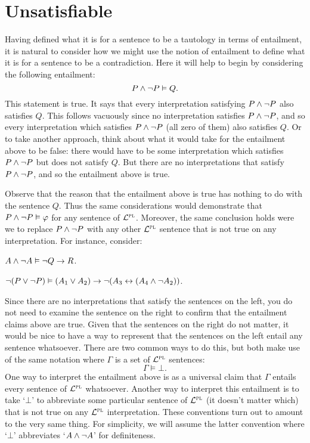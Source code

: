 \section{Unsatisfiable}

Having defined what it is for a sentence to be a tautology in terms of entailment, it is natural to consider how we might use the notion of entailment to define what it is for a sentence to be a contradiction.
Here it will help to begin by considering the following entailment:
$$P \wedge \neg P \vDash Q.$$
This statement is true.
It says that every interpretation satisfying $P \wedge \neg P$ also satisfies $Q$.
This follows vacuously since no interpretation satisfies $P \wedge \neg P$, and so every interpretation which satisfies $P \wedge \neg P$ (all zero of them) also satisfies $Q$.
Or to take another approach, think about what it would take for the entailment above to be false: there would have to be some interpretation which satisfies $P \wedge \neg P$ but does not satisfy $Q$.
But there are no interpretations that satisfy $P \wedge \neg P$, and so the entailment above is true.

Observe that the reason that the entailment above is true has nothing to do with the sentence $Q$.
Thus the same considerations would demonstrate that $P \wedge \neg P \vDash \varphi$ for any sentence \metaA of $\mathcal{L}^{\textsc{pl}}$.
Moreover, the same conclusion holds were we to replace $P \wedge \neg P$ with any other $\mathcal{L}^{\textsc{pl}}$ sentence that is not true on any interpretation.
For instance, consider:

\begin{earg}
\item[] $A \wedge \neg A \vDash \neg Q \rightarrow R$.
\item[] $\neg (P \vee \neg P) \vDash (A_1 \vee A_2) \rightarrow \neg (A_3 \leftrightarrow (A_4 \wedge \neg A_2))$.
\end{earg}

Since there are no interpretations that satisfy the sentences on the left, you do not need to examine the sentence on the right to confirm that the entailment claims above are true.
Given that the sentences on the right do not matter, it would be nice to have a way to represent that the sentences on the left entail any sentence whatsoever.
There are two common ways to do this, but both make use of the same notation where $\Gamma$ is a set of $\mathcal{L}^{\textsc{pl}}$ sentences:
$$\Gamma \models \bot.$$
One way to interpret the entailment above is as a universal claim that $\Gamma$ entails every sentence of $\mathcal{L}^{\textsc{pl}}$ whatsoever. 
Another way to interpret this entailment is to take `$\bot$' to abbreviate some particular sentence of $\mathcal{L}^{\textsc{pl}}$ (it doesn't matter which) that is not true on any $\mathcal{L}^{\textsc{pl}}$ interpretation.
These conventions turn out to amount to the very same thing.
For simplicity, we will assume the latter convention where `$\bot$' abbreviates `$A \wedge \neg A$' for definiteness.

